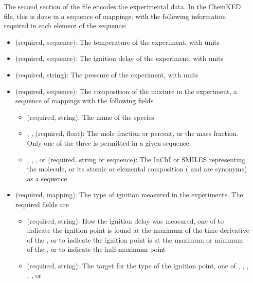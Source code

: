 \documentclass[12pt]{ussci}
\newcommand\ck{ChemKED}
\begin{document}
The second section of the file encodes the experimental data. In the \ck{} file,
this is done in a sequence of mappings, with the following information required
in each element of the sequence:
%
\begin{itemize}
    \item {} (required, sequence): The temperature of the
    experiment, with units
    \item {} (required, sequence): The ignition delay of the
    experiment, with units
    \item {} (required, string): The pressure of the experiment,
    with units
    \item {} (required, sequence): The composition of the
    mixture in the experiment, a sequence of mappings with the following fields
    \begin{itemize}
        \item {} (required, string): The name of the species
        \item {}, , 
        (required, float): The mole fraction or percent, or the mass fraction.
        Only one of the three is permitted in a given 
        sequence.
        \item {}, , , or
         (required, string or sequence): The InChI
        or SMILES representing the molecule, or its atomic or elemental
        composition ( and
         are synonyms) as a sequence
    \end{itemize}
    \item {} (required, mapping); The type of ignition
    measured in the experiments. The required fields are
    \begin{itemize}
        \item {} (required, string): How the ignition delay was
        measured, one of  to indicate the ignition point is
        found at the maximum of the time derivative of the ,
         or  to indicate the ignition point is at the
        maximum or minimum of the , or  to
        indicate the half-maximum point
        \item {} (required, string): The target for the type of the
        ignition point, one of , ,
        , , , or 
    \end{itemize}
\end{itemize}
\end{document}

